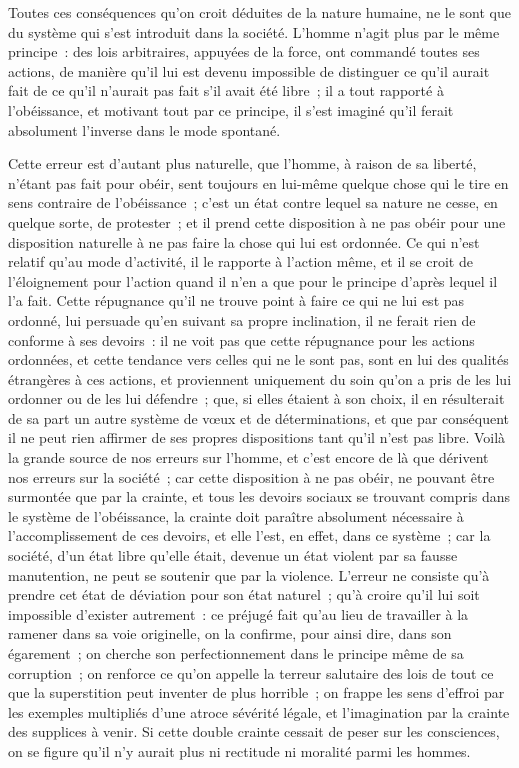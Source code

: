\documentclass[french,twoside]{book} %
\begin{document}
Toutes ces conséquences qu’on croit déduites de la nature humaine, ne le sont que du système qui s’est introduit dans la société. L’homme n’agit plus par le même principe : des lois arbitraires, appuyées de la force, ont commandé toutes ses actions, de manière qu’il lui est devenu impossible de distinguer ce qu’il aurait fait de ce qu’il n’aurait pas fait s’il avait été libre ; il a tout rapporté à l’obéissance, et motivant tout par ce principe, il s’est imaginé qu’il ferait absolument l’inverse dans le mode spontané.\par
Cette erreur est d’autant plus naturelle, que l’homme, à raison de sa liberté, n’étant pas fait pour obéir, sent toujours en lui-même quelque chose qui le tire en sens contraire de l’obéissance ; c’est un état contre lequel sa nature ne cesse, en quelque sorte, de protester ; et il prend cette disposition à ne pas obéir pour une disposition naturelle à ne pas faire la chose qui lui est ordonnée. Ce qui n’est relatif qu’au mode d’activité, il le rapporte à l’action même, et il se croit de l’éloignement pour l’action quand il n’en a que pour le principe d’après lequel il l’a fait. Cette répugnance qu’il ne trouve point à faire ce qui ne lui est pas ordonné, lui persuade qu’en suivant sa propre inclination, il ne ferait rien de conforme à ses devoirs : il ne voit pas que cette répugnance pour les actions ordonnées, et cette tendance vers celles qui ne le sont pas, sont en lui des qualités étrangères à ces actions, et proviennent uniquement du soin qu’on a pris de les lui ordonner ou de les lui défendre ; que, si elles étaient à son choix, il en résulterait de sa part un autre système de vœux et de déterminations, et que par conséquent il ne peut rien affirmer de ses propres dispositions tant qu’il n’est pas libre. Voilà la grande source de nos erreurs sur l’homme, et c’est encore de là que dérivent nos erreurs sur la société ; car cette disposition à ne pas obéir, ne pouvant être surmontée que par la crainte, et tous les devoirs sociaux se trouvant compris dans le système de l’obéissance, la crainte doit paraître absolument nécessaire à l’accomplissement de ces devoirs, et elle l’est, en effet, dans ce système ; car la société, d’un état libre qu’elle était, devenue un état violent par sa fausse manutention, ne peut se soutenir que par la violence. L’erreur ne consiste qu’à prendre cet état de déviation pour son état naturel ; qu’à croire qu’il lui soit impossible d’exister autrement : ce préjugé fait qu’au lieu de travailler à la ramener dans sa voie originelle, on la confirme, pour ainsi dire, dans son égarement ; on cherche son perfectionnement dans le principe même de sa corruption ; on renforce ce qu’on appelle la terreur salutaire des lois de tout ce que la superstition peut inventer de plus horrible ; on frappe les sens d’effroi par les exemples multipliés d’une atroce sévérité légale, et l’imagination par la crainte des supplices à venir. Si cette double crainte cessait de peser sur les consciences, on se figure qu’il n’y aurait plus ni rectitude ni moralité parmi les hommes.\par
\end{document}
